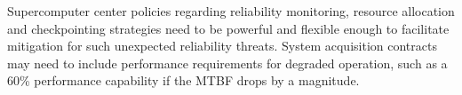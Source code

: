 Supercomputer center policies regarding reliability monitoring, resource
allocation and checkpointing strategies need to be powerful and flexible enough
to facilitate mitigation for such unexpected reliability threats. System
acquisition contracts may need to include performance requirements for degraded
operation, such as a 60\% performance capability if the MTBF drops by a
magnitude.
